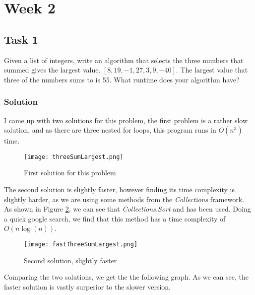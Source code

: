 \documentclass{article}
\begin{document}
   \section{Week 2} 
   \subsection{Task 1}

Given a list of integers, write an algorithm that selects the three numbers that summed gives the largest value. 
\( [8, 19, -1, 27, 3, 9, -40] \). The largest value that three of the numbers sums to is 55. What runtime does your algorithm have?

\subsubsection{Solution}
I came up with two solutions for this problem, the first problem is a rather slow solution, and as there are three nested for loops, this program runs in \( O\left( n^3 \right) \) time.

\begin{figure}[H]
    \begin{center}
        \texttt{[image: threeSumLargest.png]}
    \end{center}
    \caption{First solution for this problem}
    \label{fig:threeSumLargest}
\end{figure}

The second solution is slightly faster, however finding its time complexity is slightly harder, as we are using some methods from the \textit{Collections} framework. As shown in Figure \ref{fig:fastThreeSumLargest.png}, we can see that \textit{Collections.Sort} and has been used. Doing a quick google search, we find that this method has a time complexity of \( O\left( n \log\left( n \right) \right) \).

\begin{figure}[H]
    \begin{center}
        \texttt{[image: fastThreeSumLargest.png]}
    \end{center}
    \caption{Second solution, slightly faster}
    \label{fig:fastThreeSumLargest.png}
\end{figure}

Comparing the two solutions, we get the the following graph. As we can see, the faster solution is vastly surperior to the slower version.
\end{document}
